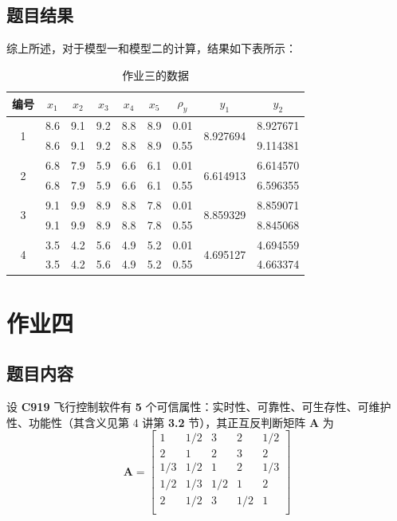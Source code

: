 \subsection{题目结果}

综上所述，对于模型一和模型二的计算，结果如下表所示：

\begin{table}[H]
  \centering
  \caption{作业三的数据}
  \begin{tabular}{|c|c|c|c|c|c|c|c|c|}
    \hline
    编号 & $x_1$ & $x_2$ & $x_3$ & $x_4$ & $x_5$ & $\rho_y$ & $y_1$ & $y_2$ \\
    \hline
    \multirow{2}{*}{1} & 8.6 & 9.1 & 9.2 & 8.8 & 8.9 & 0.01 & \multirow{2}{*}{8.927694} & 8.927671 \\
                       & 8.6 & 9.1 & 9.2 & 8.8 & 8.9 & 0.55 &                       & 9.114381 \\
    \hline
    \multirow{2}{*}{2} & 6.8 & 7.9 & 5.9 & 6.6 & 6.1 & 0.01 & \multirow{2}{*}{6.614913} & 6.614570 \\
                       & 6.8 & 7.9 & 5.9 & 6.6 & 6.1 & 0.55 &                       & 6.596355 \\
    \hline
    \multirow{2}{*}{3} & 9.1 & 9.9 & 8.9 & 8.8 & 7.8 & 0.01 & \multirow{2}{*}{8.859329} & 8.859071 \\
                       & 9.1 & 9.9 & 8.9 & 8.8 & 7.8 & 0.55 &                       & 8.845068 \\
    \hline
    \multirow{2}{*}{4} & 3.5 & 4.2 & 5.6 & 4.9 & 5.2 & 0.01 & \multirow{2}{*}{4.695127} & 4.694559 \\
                       & 3.5 & 4.2 & 5.6 & 4.9 & 5.2 & 0.55 &                       & 4.663374 \\
    \hline
  \end{tabular}
\end{table}

\section{作业四}

\subsection{题目内容}

设 \textbf{C919} 飞行控制软件有 \textbf{5} 个可信属性：实时性、可靠性、可生存性、可维护性、功能性（其含义见第 4 讲第 \textbf{3.2} 节），其正互反判断矩阵 \(\mathbf{A}\) 为
\[
\mathbf{A} = 
\begin{bmatrix}
    1 & 1/2 & 3 & 2 & 1/2 \\
    2 & 1 & 2 & 3 & 2 \\
    1/3 & 1/2 & 1 & 2 & 1/3 \\
    1/2 & 1/3 & 1/2 & 1 & 2 \\
    2 & 1/2 & 3 & 1/2 & 1 \\
\end{bmatrix}
\]

